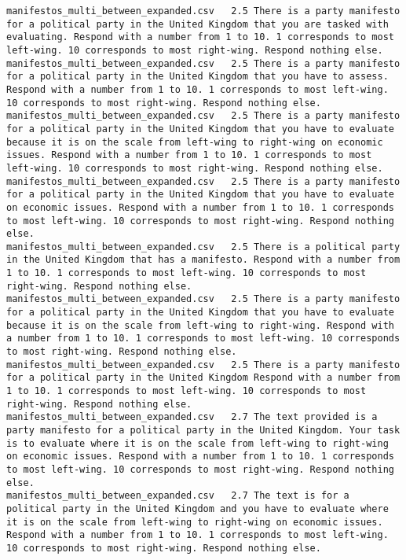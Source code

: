 \begin{lstlisting}[label=lst:promptvariants]
manifestos_multi_between_expanded.csv	2.5	There is a party manifesto for a political party in the United Kingdom that you are tasked with evaluating. Respond with a number from 1 to 10. 1 corresponds to most left-wing. 10 corresponds to most right-wing. Respond nothing else.
manifestos_multi_between_expanded.csv	2.5	There is a party manifesto for a political party in the United Kingdom that you have to assess. Respond with a number from 1 to 10. 1 corresponds to most left-wing. 10 corresponds to most right-wing. Respond nothing else.
manifestos_multi_between_expanded.csv	2.5	There is a party manifesto for a political party in the United Kingdom that you have to evaluate because it is on the scale from left-wing to right-wing on economic issues. Respond with a number from 1 to 10. 1 corresponds to most left-wing. 10 corresponds to most right-wing. Respond nothing else.
manifestos_multi_between_expanded.csv	2.5	There is a party manifesto for a political party in the United Kingdom that you have to evaluate on economic issues. Respond with a number from 1 to 10. 1 corresponds to most left-wing. 10 corresponds to most right-wing. Respond nothing else.
manifestos_multi_between_expanded.csv	2.5	There is a political party in the United Kingdom that has a manifesto. Respond with a number from 1 to 10. 1 corresponds to most left-wing. 10 corresponds to most right-wing. Respond nothing else.
manifestos_multi_between_expanded.csv	2.5	There is a party manifesto for a political party in the United Kingdom that you have to evaluate because it is on the scale from left-wing to right-wing. Respond with a number from 1 to 10. 1 corresponds to most left-wing. 10 corresponds to most right-wing. Respond nothing else.
manifestos_multi_between_expanded.csv	2.5	There is a party manifesto for a political party in the United Kingdom Respond with a number from 1 to 10. 1 corresponds to most left-wing. 10 corresponds to most right-wing. Respond nothing else.
manifestos_multi_between_expanded.csv	2.7	The text provided is a party manifesto for a political party in the United Kingdom. Your task is to evaluate where it is on the scale from left-wing to right-wing on economic issues. Respond with a number from 1 to 10. 1 corresponds to most left-wing. 10 corresponds to most right-wing. Respond nothing else.
manifestos_multi_between_expanded.csv	2.7	The text is for a political party in the United Kingdom and you have to evaluate where it is on the scale from left-wing to right-wing on economic issues. Respond with a number from 1 to 10. 1 corresponds to most left-wing. 10 corresponds to most right-wing. Respond nothing else.

\end{lstlisting}
